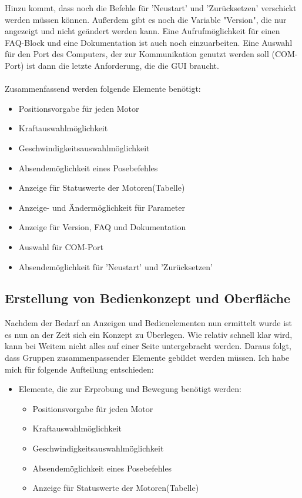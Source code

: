 \documentclass[11pt]{scrartcl}
\begin{document}
\begin{onehalfspace}
Hinzu kommt, dass noch die Befehle für 'Neustart'  und  'Zurücksetzen' verschickt werden müssen können. Außerdem gibt es noch die Variable "Version", die nur angezeigt und nicht geändert werden kann. Eine Aufrufmöglichkeit für einen FAQ-Block und eine Dokumentation ist auch noch einzuarbeiten. Eine Auswahl für den Port des Computers, der zur Kommunikation genutzt werden soll (COM-Port) ist dann die letzte Anforderung, die die GUI braucht.\\\\

Zusammenfassend werden folgende Elemente benötigt:

\begin{itemize}
 \item Positionsvorgabe für jeden Motor
 \item Kraftauswahlmöglichkeit
 \item Geschwindigkeitsauswahlmöglichkeit
 \item Absendemöglichkeit eines Posebefehles
 \item Anzeige für Statuswerte der Motoren(Tabelle)
 \item Anzeige- und Ändermöglichkeit für Parameter
 \item Anzeige für Version, FAQ und Dokumentation
 \item Auswahl für COM-Port
 \item Absendemöglichkeit für 'Neustart' und 'Zurücksetzen'
\end{itemize}



\subsection{Erstellung von Bedienkonzept und Oberfläche}

Nachdem der Bedarf an Anzeigen und Bedienelementen nun ermittelt wurde ist es nun an der Zeit sich ein Konzept zu Überlegen. Wie relativ schnell klar wird, kann bei Weitem nicht alles auf einer Seite untergebracht werden. Daraus folgt, dass Gruppen zusammenpassender Elemente gebildet werden müssen. Ich habe mich für folgende Aufteilung entschieden:

\begin{itemize}
\item Elemente, die zur Erprobung und Bewegung benötigt werden:
\begin{itemize}
 \item Positionsvorgabe für jeden Motor
 \item Kraftauswahlmöglichkeit
 \item Geschwindigkeitsauswahlmöglichkeit
 \item Absendemöglichkeit eines Posebefehles
 \item Anzeige für Statuswerte der Motoren(Tabelle)
\end{itemize}


\end{itemize}
\end{onehalfspace}
\end{document}
